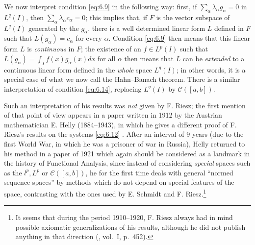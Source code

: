 \documentclass[12pt,a4paper,leqno,twoside]{extbook}
\newcommand{\Cont}{\mathcal{C}}
\begin{document}
We now interpret condition \eqref{eq:6.9} in the following way: first, if \(\sum\limits_\alpha \lambda_\alpha g_\alpha = 0\) in \(L^q(I)\), then \(\sum\limits_\alpha \lambda_\alpha c_\alpha = 0\); this implies that, if \(F\) is the vector subspace of \(L^q(I)\) generated by the \(g_\alpha\), there is a well determined linear form \(L\) defined in \(F\) such that \(L(g_\alpha) = c_\alpha\) for every \(\alpha\). Condition \eqref{eq:6.9} then means that this linear form \(L\) is \emph{continuous} in \(F\); the existence of an \(f \in L^p(I)\) such that \(L(g_\alpha) = \int_I f(x)g_\alpha(x)dx\) for all \(\alpha\) then means that \(L\) can be \emph{extended} to a continuous linear form defined in the \emph{whole} space \(L^q(I)\); in other words, it is a special case of what we now call the Hahn--Banach theorem. There is a similar interpretation of condition \eqref{eq:6.14}, replacing \(L^q(I)\) by \(\Cont([a,b])\).

Such an interpretation of his results was \emph{not} given by F. Riesz; the first mention of that point of view appears in a paper written in 1912 by the Austrian mathematician E. Helly (1884--1943), in which he gives a different proof of F. Riesz's results on the systems \eqref{eq:6.12} \cite{107bis}. After an interval of 9 years (due to the first World War, in which he was a prisoner of war in Russia), Helly returned to his method in a paper of 1921 \cite{108} which again should be considered as a landmark in the history of Functional Analysis, since instead of considering \emph{special} spaces such as the \(l^p, L^p\) or \(\Cont([a,b])\), he for the first time deals with general ``normed sequence spaces'' by methods which do not depend on special features of the space, contrasting with the ones used by E. Schmidt and F. Riesz.\footnote{It seems that during the period 1910--1920, F. Riesz always had in mind possible axiomatic generalizations of his results, although he did not publish anything in that direction (\cite{183}, vol.~I, p.~452).}
\end{document}
